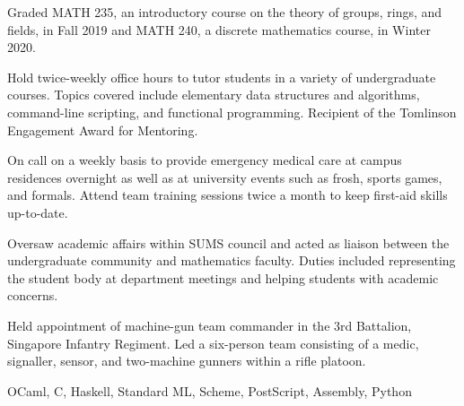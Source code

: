 
\smallskip
\noindent Graded MATH 235, an introductory course on the theory of groups, rings, and fields, in Fall 2019
and MATH 240, a discrete mathematics course, in Winter 2020.
\medskip

\smallskip
\noindent Hold twice-weekly office hours to tutor students in a variety of undergraduate courses.
Topics covered include elementary data structures and algorithms, command-line scripting,
and functional programming. Recipient of the Tomlinson Engagement Award for Mentoring.
\medskip

\filbreak %

\smallskip
\noindent On call on a weekly basis to provide emergency medical care at campus residences overnight as well as at
university events such as frosh, sports games, and formals. Attend team training sessions twice a month to keep
first-aid skills up-to-date.
\medskip

\smallskip
\noindent Oversaw academic affairs within SUMS council and acted as liaison between the undergraduate community and
mathematics faculty. Duties included representing the student body at department meetings and helping students with
academic concerns.
\medskip

\smallskip
\noindent Held appointment of machine-gun team commander in the 3rd Battalion, Singapore Infantry Regiment.
Led a six-person team consisting of a medic, signaller, sensor, and two-machine gunners within a rifle platoon.
\medskip


\par
\noindent OCaml, C, Haskell, Standard ML, Scheme, PostScript, Assembly, Python
\medskip

